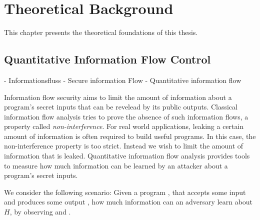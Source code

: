 \chapter{Theoretical Background}\label{sec:basics}

This chapter presents the theoretical foundations of this thesis. 

\section{Quantitative Information Flow Control}

- Informationsfluss
- Secure information Flow
- Quantitative information flow


Information flow security aims to limit the amount of information about a program's secret inputs that can be revelead by its public outputs. Classical information flow analysis tries to prove the absence of such information flows, a property called \emph{non-interference}.
For real world applications, leaking a certain amount of information is often required to build useful programs. In this case, the non-interference property is too strict. Instead we wish to limit the amount of information that is leaked.
Quantitative information flow analysis provides tools to measure how much information can be learned by an attacker about a program's secret inputs.



We consider the following scenario: Given a program \p, that accepts some input \In and produces some output \Out, how much information can an adversary \A learn about $H$, by observing \p and \Out.

